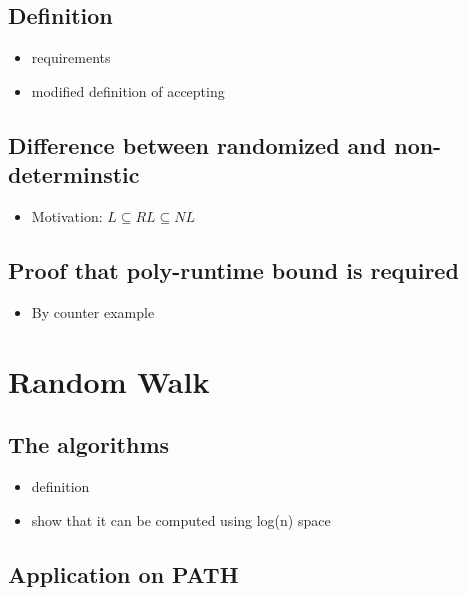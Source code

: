 \section{Definition}\label{definition}

\begin{itemize}
\itemsep1pt\parskip0pt
\item
  requirements
\item
  modified definition of accepting
\end{itemize}

\section{Difference between randomized and
non-determinstic}\label{difference-between-randomized-and-non-determinstic}

\begin{itemize}
\itemsep1pt\parskip0pt
\item
  Motivation: $L \subseteq RL \subseteq NL$
\end{itemize}

\section{Proof that poly-runtime bound is
required}\label{proof-that-poly-runtime-bound-is-required}

\begin{itemize}
\itemsep1pt\parskip0pt
\item
  By counter example
\end{itemize}

\chapter{Random Walk}\label{random-walk}

\section{The algorithms}\label{the-algorithms}

\begin{itemize}
\itemsep1pt\parskip0pt
\item
  definition
\item
  show that it can be computed using log(n) space
\end{itemize}

\section{Application on PATH}\label{application-on-path}

